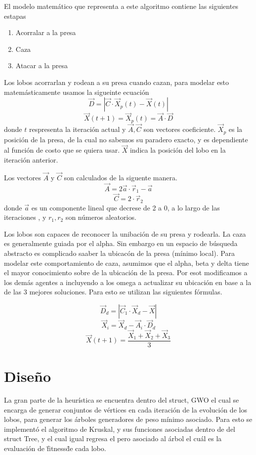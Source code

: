 \documentclass[a4paper]{report}
\begin{document}
El modelo matem\'atico que representa a este algoritmo contiene las siguientes estapas
\begin{enumerate}
\item Acorralar a la presa
\item Caza
\item Atacar a la presa
  \end{enumerate}

  Los lobos acorrarlan y rodean a su presa cuando cazan, para modelar esto matem\'asticamente usamos
  la sigueinte ecuaci\'on
  \[\vec{D} = | \vec{C} \cdot \vec{X}_p(t) - \vec{X}(t)|\]
  \[\vec{X} (t+1) = \vec{X}_p (t) = \vec{A} \cdot \vec{D}\]
  donde $t$ respresenta la iteraci\'on actual y $\vec{A}, \vec{C}$ son vectores coeficiente. $\vec{X}_p$ es la posici\'on de la presa, de la cual no sabemos su paradero exacto, y es dependiente  al funci\'on de costo que se quiera usar. $\vec{X}$ indica la posici\'on del lobo en la iteraci\'on anterior.

Los vectores $\vec{A} $  y $\vec{C} $ son calculados de la siguente manera.
\[\vec{A} = 2 \vec{a} \cdot \vec{r}_1 -\vec{a}\]
\[\vec{C} = 2 \cdot \vec{r}_2\]
donde $\vec{a} $ es un componente lineal que decrese de 2 a 0, a lo largo de las iteraciones , y $r_1, r_2$ son n\'umeros aleatorios.

Los lobos son capaces de reconocer la unibaci\'on de su presa y rodearla. La caza es generalmente
guiada por el alpha. Sin embargo en un espacio de b\'usqueda abstracto es complicado saaber la
ubicac\'on de la presa (m\'inimo local). Para modelar este comportamiento de caza, asumimos que el alpha,
beta y delta tiene el mayor conocimiento sobre de la ubicaci\'on de la presa. Por esot modificamos  a los
dem\'as agentes a incluyendo a los omega a actualizar su ubicaci\'on en base a la de las 3
mejores soluciones. Para esto se utilizan las siguientes f\'ormulas.

\[\vec{D}_d = |\vec{C}_1\cdot  \vec{X}_d - \vec{X}|\]
\[\vec{X}_i = \vec{X}_d - \vec{A}_i \cdot \vec{D}_d\]
\[\vec{X}(t+1)  = \frac{\vec{X}_1 + \vec{X}_2 + \vec{X}_3}{3}\]


  
\section*{Diseño}

La gran parte de la heur\'istica se encuentra dentro del struct, GWO el cual se encarga de generar
conjuntos de v\'ertices en cada iteraci\'on de la evoluci\'on de los lobos, para generar los
\'arboles generadores de peso m\'inimo asociado. Para esto se implement\'o el algoritmo de Kruskal,
y sus funciones asociadas dentro de del struct Tree, y el cual igual regresa el pero asociado al
\'arbol el cu\'al es la evaluaci\'on de \"fitness\" de cada lobo.
\end{document}
